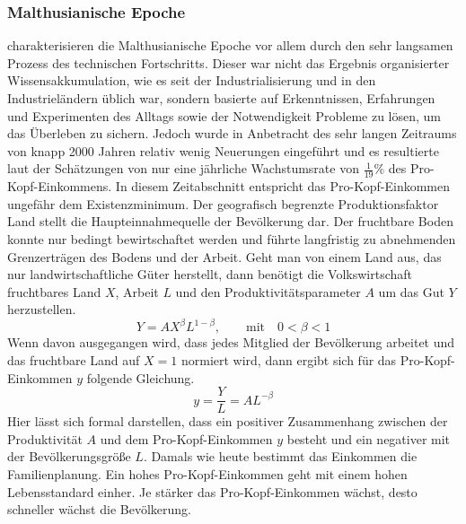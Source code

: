 \subsubsection*{Malthusianische Epoche}
\cite{Ashraf.2011} charakterisieren die Malthusianische Epoche vor allem durch den sehr langsamen Prozess des technischen Fortschritts. Dieser war nicht das Ergebnis organisierter Wissensakkumulation, wie es seit der Industrialisierung und in den Industrie\-ländern üblich war, sondern basierte auf Erkenntnissen, Erfahrungen und Experimenten des Alltags sowie der Notwendigkeit Probleme zu lösen, um das Überleben zu sichern. Jedoch wurde in Anbetracht des sehr langen Zeitraums von knapp 2000 Jahren relativ wenig Neuerungen eingeführt und es resultierte laut der Schätzungen von \cite{Maddison.2001} nur eine jährliche Wachstumsrate von $\frac{1}{19}\%$ des Pro-Kopf-Einkommens. In diesem Zeitabschnitt entspricht das Pro-Kopf-Einkommen ungefähr dem Existenzminimum. Der geografisch begrenzte Produktionsfaktor Land stellt die Haupteinnahmequelle der Bevölkerung dar. Der fruchtbare Boden konnte nur bedingt bewirtschaftet werden und führte langfristig zu abnehmenden Grenzerträgen des Bodens und der Arbeit. Geht man von einem Land aus, das nur landwirtschaftliche Güter herstellt, dann benötigt die Volkswirtschaft fruchtbares Land $X$, Arbeit $L$ und den Produktivitätsparameter $A$ um das Gut $Y$ herzustellen.
%
	\begin{equation}
		Y=AX^\beta L^{1-\beta},  \qquad \text{mit}\quad 0< \beta < 1
	\end{equation}
%	
Wenn davon ausgegangen wird, dass jedes Mitglied der Bevölkerung arbeitet und das fruchtbare Land  auf $X=1$ normiert wird, dann ergibt sich für das Pro-Kopf-Einkommen $y$ folgende Gleichung. 
%
	\begin{equation}
		y=\frac{Y}{L}=AL^{-\beta}
	\end{equation}
%
Hier lässt sich formal darstellen, dass ein positiver Zusammenhang zwischen der Produktivität $A$ und dem Pro-Kopf-Einkommen $y$ besteht und ein negativer mit der Bevölkerungsgröße $L$. Damals wie heute bestimmt das Einkommen die Familienplanung. Ein hohes Pro-Kopf-Einkommen geht mit einem hohen Lebensstandard einher. Je stärker das Pro-Kopf-Einkommen wächst, desto schneller wächst die Bevölkerung.\\
%
